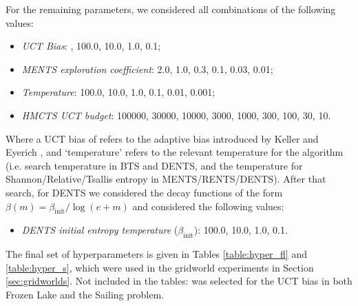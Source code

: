     For the remaining parameters, we considered all combinations of the following values:
    \begin{itemize}
        \item \textit{UCT Bias}: %
            , 100.0, 10.0, 1.0, 0.1;
        \item \textit{MENTS exploration coefficient}: 2.0, 1.0, 0.3, 0.1, 0.03, 0.01;
        \item \textit{Temperature}: 100.0, 10.0, 1.0, 0.1, 0.01, 0.001;
        \item \textit{HMCTS UCT budget}: 100000, 30000, 10000, 3000, 1000, 300, 100, 30, 10.
    \end{itemize}

    Where a UCT bias of %
    refers to the adaptive bias introduced by Keller and Eyerich %
    , and `temperature' refers to the relevant temperature for the algorithm (i.e. search temperature in BTS and DENTS, and the temperature for Shannon/Relative/Tsallis entropy in MENTS/RENTS/DENTS). After that search, for DENTS we considered the decay functions of the form $\beta(m)=\beta_{\text{init}}/\log(e+m)$ and considered the following values:
    \begin{itemize}
            \item \textit{DENTS initial entropy temperature} ($\beta_{\text{init}}$): 100.0, 10.0, 1.0, 0.1.
    \end{itemize}
    The final set of hyperparameters is given in Tables \ref{table:hyper_fl} and \ref{table:hyper_s}, which were used in the gridworld experiments in Section \ref{sec:gridworlds}. Not included in the tables: %
    was selected for the UCT bias in both Frozen Lake and the Sailing problem.

